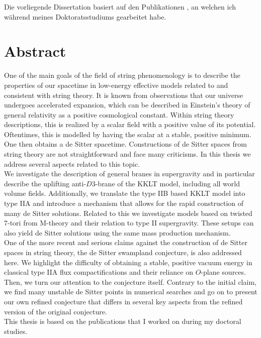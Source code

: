 \documentclass[a4paper,12pt,twoside,openright]{report}
\begin{document}
Die vorliegende Dissertation basiert auf den Publikationen \cite{Roupec:2018mbn,Banlaki:2018ayh,Andriot:2018mav,Cribiori:2019hod,Cribiori:2019bfx,Cribiori:2019drf,Cribiori:2019hrb,Cribiori:2020bgt}, an welchen ich während meines Doktoratsstudiums gearbeitet habe.

\newpage\thispagestyle{empty}\vspace*{\fill}
\null%
\vspace*{\fill}\newpage

\section*{Abstract}
One of the main goals of the field of string phenomenology is to describe the properties of our spacetime in low-energy effective models related to and consistent with string theory. It is known from observations that our universe undergoes accelerated expansion, which can be described in Einstein's theory of general relativity as a positive cosmological constant. Within string theory descriptions, this is realized by a scalar field with a positive value of its potential. Oftentimes, this is modelled by having the scalar at a stable, positive minimum. One then obtains a de Sitter spacetime. Constructions of de Sitter spaces from string theory are not straightforward and face many criticisms. In this thesis we address several aspects related to this topic.\\
We investigate the description of general branes in supergravity and in particular describe the uplifting anti-$D3$-brane of the KKLT model, including all world volume fields. Additionally, we translate the type IIB based KKLT model into type IIA and introduce a mechanism that allows for the rapid construction of many de Sitter solutions. Related to this we investigate models based on twisted $7$-tori from M-theory and their relation to type II supergravity. These setups can also yield de Sitter solutions using the same mass production mechanism.\\
One of the more recent and serious claims against the construction of de Sitter spaces in string theory, the de Sitter swampland conjecture, is also addressed here. We highlight the difficulty of obtaining a stable, positive vacuum energy in classical type IIA flux compactifications and their reliance on $O$-plane sources. Then, we turn our attention to the conjecture itself. Contrary to the initial claim, we find many unstable de Sitter points in numerical searches and go on to present our own refined conjecture that differs in several key aspects from the refined version of the original conjecture.\vspace{12pt}\\
This thesis is based on the publications \cite{Roupec:2018mbn,Banlaki:2018ayh,Andriot:2018mav,Cribiori:2019hod,Cribiori:2019bfx,Cribiori:2019drf,Cribiori:2019hrb,Cribiori:2020bgt} that I worked on during my doctoral studies.
\end{document}
